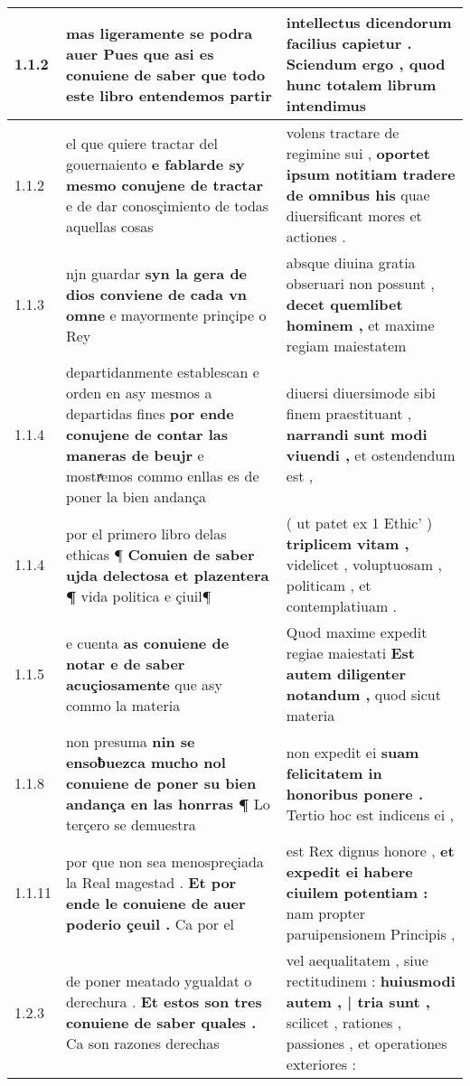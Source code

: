 \begin{tabular}{|p{1cm}|p{6.5cm}|p{6.5cm}|}

\hline
1.1.2 & mas ligeramente se podra auer \textbf{ Pues que asi es conuiene de saber } que todo este libro entendemos partir & intellectus dicendorum facilius capietur . \textbf{ Sciendum ergo , } quod hunc totalem librum intendimus \\\hline
1.1.2 & el que quiere tractar del gouernaiento \textbf{ e fablarde sy mesmo conujene de tractar } e de dar conosçimiento de todas aquellas cosas & volens tractare de regimine sui , \textbf{ oportet ipsum notitiam tradere de omnibus his } quae diuersificant mores et actiones . \\\hline
1.1.3 & njn guardar \textbf{ syn la gera de dios conviene de cada vn omne } e mayormente prinçipe o Rey & absque diuina gratia obseruari non possunt , \textbf{ decet quemlibet hominem , } et maxime regiam maiestatem \\\hline
1.1.4 & departidanmente establescan e orden en asy mesmos a departidas fines \textbf{ por ende conujene de contar las maneras de beujr } e mostrͣemos commo enllas es de poner la bien andança & diuersi diuersimode sibi finem praestituant , \textbf{ narrandi sunt modi viuendi , } et ostendendum est , \\\hline
1.1.4 & por el primero libro delas ethicas ¶ \textbf{ Conuien de saber ujda delectosa et plazentera ¶ } vida politica e çiuil¶ & ( ut patet ex 1 Ethic’ ) \textbf{ triplicem vitam , } videlicet , voluptuosam , politicam , et contemplatiuam . \\\hline
1.1.5 & e cuenta \textbf{ as conuiene de notar e de saber acuçiosamente } que asy commo la materia & Quod maxime expedit regiae maiestati \textbf{ Est autem diligenter notandum , } quod sicut materia \\\hline
1.1.8 & non presuma \textbf{ nin se ensoƀuezca mucho nol conuiene de poner su bien andança en las honrras ¶ } Lo terçero se demuestra & non expedit ei \textbf{ suam felicitatem in honoribus ponere . } Tertio hoc est indicens ei , \\\hline
1.1.11 & por que non sea menospreçiada la Real magestad . \textbf{ Et por ende le conuiene de auer poderio çeuil . } Ca por el & est Rex dignus honore , \textbf{ et expedit ei habere ciuilem potentiam : } nam propter paruipensionem Principis , \\\hline
1.2.3 & de poner meatado ygualdat o derechura . \textbf{ Et estos son tres conuiene de saber quales . } Ca son razones derechas & vel aequalitatem , siue rectitudinem : \textbf{ huiusmodi autem , | tria sunt , } scilicet , rationes , passiones , et operationes exteriores : \\\hline

\end{tabular}
